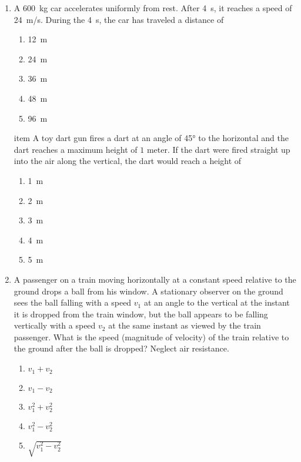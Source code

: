 \documentclass{../../../oss-apphys}
\begin{document}
\begin{multicols}{2}
\begin{enumerate}[resume,leftmargin=18pt]
  \item A \SI{600}{\kilo\gram} car accelerates uniformly from rest. After
    \SI{4}{\second}, it reaches a speed of \SI{24}{m/s}. During the
    \SI{4}{\second}, the car has traveled a distance of
    \begin{enumerate}[noitemsep,topsep=0pt,leftmargin=18pt,label=(\Alph*)]
    \item\SI{12}{\metre}
    \item\SI{24}{\metre}
    \item\SI{36}{\metre}
    \item\SI{48}{\metre}
    \item\SI{96}{\metre}
    \end{enumerate}

  item A toy dart gun fires a dart at an angle of \ang{45} to the horizontal
    and the dart reaches a maximum height of $1$ meter. If the dart were fired
    straight up into the air along the vertical, the dart would reach a height
    of
    \begin{enumerate}[noitemsep,topsep=0pt,leftmargin=18pt,label=(\Alph*)]
    \item\SI{1}{\metre}
    \item\SI{2}{\metre}
    \item\SI{3}{\metre}
    \item\SI{4}{\metre}
    \item\SI{5}{\metre}
    \end{enumerate}
    
  \item A passenger on a train moving horizontally at a constant speed relative
    to the ground drops a ball from his window. A stationary observer on the
    ground sees the ball falling with a speed $v_1$ at an angle to the vertical
    at the instant it is dropped from the train window, but the ball appears to
    be falling vertically with a speed $v_2$ at the same instant as viewed by
    the train passenger. What is the speed (magnitude of velocity) of the train
    relative to the ground after the ball is dropped? Neglect air resistance.
    \begin{enumerate}[noitemsep,topsep=0pt,leftmargin=18pt,label=(\Alph*)]
    \item $ v_1 + v_2$
    \item $ v_1 - v_2$
    \item $ v_1^2 + v_2^2$
    \item $ v_1^2 - v_2^2$
    \item $\sqrt{v_1^2 - v_2^2}$
    \end{enumerate}
      

\end{enumerate}
\end{multicols}
\end{document}
